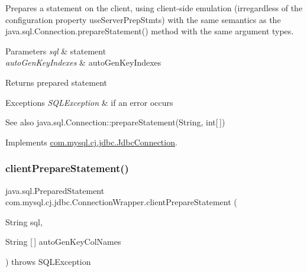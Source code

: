 Prepares a statement on the client, using client-\/side emulation (irregardless of the configuration property \textquotesingle{}use\+Server\+Prep\+Stmts\textquotesingle{}) with the same semantics as the java.\+sql.\+Connection.\+prepare\+Statement() method with the same argument types.


\begin{DoxyParams}{Parameters}
{\em sql} & statement \\
\hline
{\em auto\+Gen\+Key\+Indexes} & auto\+Gen\+Key\+Indexes \\
\hline
\end{DoxyParams}
\begin{DoxyReturn}{Returns}
prepared statement 
\end{DoxyReturn}

\begin{DoxyExceptions}{Exceptions}
{\em S\+Q\+L\+Exception} & if an error occurs\\
\hline
\end{DoxyExceptions}
\begin{DoxySeeAlso}{See also}
java.\+sql.\+Connection\+::prepare\+Statement(\+String, int\mbox{[}$\,$\mbox{]}) 
\end{DoxySeeAlso}


Implements \mbox{\hyperlink{interfacecom_1_1mysql_1_1cj_1_1jdbc_1_1_jdbc_connection_a11927338ef48e164fdd8444b6b273162}{com.\+mysql.\+cj.\+jdbc.\+Jdbc\+Connection}}.

\mbox{\label{classcom_1_1mysql_1_1cj_1_1jdbc_1_1_connection_wrapper_acae69d4edeb44d1ecd2f6750e0312341}} 
\subsubsection{\texorpdfstring{client\+Prepare\+Statement()}{clientPrepareStatement()}\hspace{0.1cm}{\footnotesize\ttfamily [6/6]}}
{\footnotesize\ttfamily java.\+sql.\+Prepared\+Statement com.\+mysql.\+cj.\+jdbc.\+Connection\+Wrapper.\+client\+Prepare\+Statement (\begin{DoxyParamCaption}\item[{String}]{sql,  }\item[{String \mbox{[}$\,$\mbox{]}}]{auto\+Gen\+Key\+Col\+Names }\end{DoxyParamCaption}) throws S\+Q\+L\+Exception}

